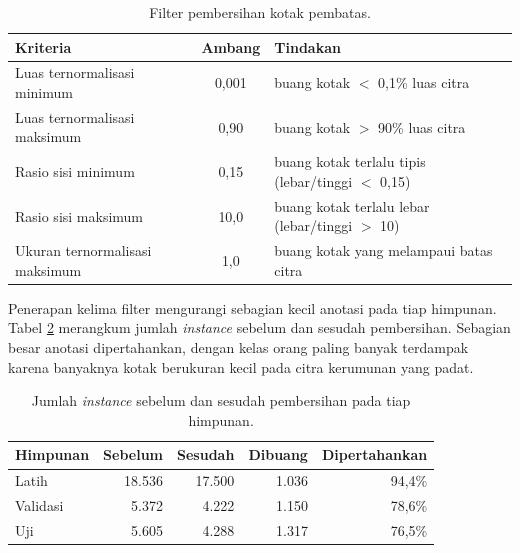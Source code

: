 \begin{table}[h]
    \centering
    \caption{Filter pembersihan kotak pembatas.}
    \label{tab:filter_cleaning}
    \begin{tabular}{|p{5.8cm}|c|p{5cm}|}
        \hline
        \textbf{Kriteria} & \textbf{Ambang} & \textbf{Tindakan} \\
        \hline \hline
        Luas ternormalisasi minimum & 0,001 & buang kotak $<$ 0,1\% luas citra \\
        \hline
        Luas ternormalisasi maksimum & 0,90 & buang kotak $>$ 90\% luas citra \\
        \hline
        Rasio sisi minimum & 0,15 & buang kotak terlalu tipis (lebar/tinggi $<$ 0,15) \\
        \hline
        Rasio sisi maksimum & 10,0 & buang kotak terlalu lebar (lebar/tinggi $>$ 10) \\
        \hline  
        Ukuran ternormalisasi maksimum & 1,0 & buang kotak yang melampaui batas citra \\
        \hline
    \end{tabular}
\end{table}

Penerapan kelima filter mengurangi sebagian kecil anotasi pada tiap himpunan. Tabel 
\ref{tab:efek_cleaning} merangkum jumlah \textit{instance} sebelum dan sesudah pembersihan. 
Sebagian besar anotasi dipertahankan, dengan kelas orang paling banyak terdampak karena 
banyaknya kotak berukuran kecil pada citra kerumunan yang padat.

\begin{table}[h]
    \centering
    \caption{Jumlah \textit{instance} sebelum dan sesudah pembersihan pada tiap himpunan.}
    \label{tab:efek_cleaning}
    \begin{tabular}{|l|r|r|r|r|}
        \hline
        \textbf{Himpunan} & \textbf{Sebelum} & \textbf{Sesudah} & \textbf{Dibuang} & \textbf{Dipertahankan} \\
        \hline \hline
        Latih & 18.536 & 17.500 & 1.036 & 94,4\% \\
        Validasi & 5.372 & 4.222 & 1.150 & 78,6\% \\
        Uji & 5.605 & 4.288 & 1.317 & 76,5\% \\
        \hline
    \end{tabular}
\end{table}

